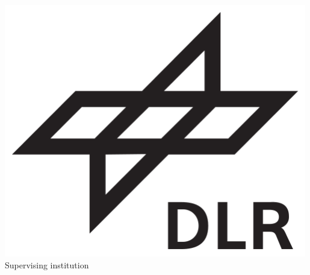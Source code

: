 \documentclass[final,hyperref={pdfpagelabels=false}]{beamer}
\begin{document}
\begin{frame}
\begin{minipage}{0.31\paperwidth}
\begin{minipage}[t][][t]{0.25\textwidth}
\centering
\vspace{22pt}
\includegraphics[width=0.99\textwidth]{pics/logo_dlr.png}
\tiny{Supervising institution}
\end{minipage}


\end{minipage}
\end{frame}                                            
\end{document}
